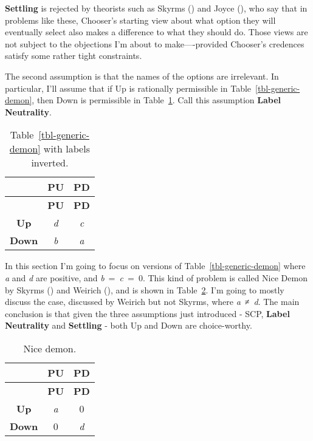 \documentclass[
  11pt,
  letterpaper,
  DIV=11,
  numbers=noendperiod,
  twoside]{scrartcl}
\begin{document}
\textbf{Settling} is rejected by theorists such as Skyrms
() and Joyce
(), who say that in problems like these,
Chooser's starting view about what option they will eventually select
also makes a difference to what they should do. Those views are not
subject to the objections I'm about to make----provided Chooser's
credences satisfy some rather tight constraints.

The second assumption is that the names of the options are irrelevant.
In particular, I'll assume that if Up is rationally permissible in
Table~\ref{tbl-generic-demon}, then Down is permissible in
Table~\ref{tbl-inverted-generic}. Call this assumption \textbf{Label
Neutrality}.

\begin{longtable}[]{@{}ccc@{}}
\caption{Table~\ref{tbl-generic-demon} with labels
inverted.}\label{tbl-inverted-generic}\tabularnewline
\toprule\noalign{}
& \textbf{PU} & \textbf{PD} \\
\midrule\noalign{}
\endfirsthead
\toprule\noalign{}
& \textbf{PU} & \textbf{PD} \\
\midrule\noalign{}
\endhead
\bottomrule\noalign{}
\endlastfoot
\textbf{Up} & \emph{d} & \emph{c} \\
\textbf{Down} & \emph{b} & \emph{a} \\
\end{longtable}

In this section I'm going to focus on versions of
Table~\ref{tbl-generic-demon} where \emph{a} and \emph{d} are positive,
and \emph{b}~=~\emph{c}~=~0. This kind of problem is called Nice Demon
by Skyrms () and Weirich
(), and is shown in
Table~\ref{tbl-nice-demon}. I'm going to mostly discuss the case,
discussed by Weirich but not Skyrms, where \emph{a}~≠~\emph{d}. The main
conclusion is that given the three assumptions just introduced - SCP,
\textbf{Label Neutrality} and \textbf{Settling} - both Up and Down are
choice-worthy.

\begin{longtable}[]{@{}ccc@{}}
\caption{Nice demon.}\label{tbl-nice-demon}\tabularnewline
\toprule\noalign{}
& \textbf{PU} & \textbf{PD} \\
\midrule\noalign{}
\endfirsthead
\toprule\noalign{}
& \textbf{PU} & \textbf{PD} \\
\midrule\noalign{}
\endhead
\bottomrule\noalign{}
\endlastfoot
\textbf{Up} & \emph{a} & 0 \\
\textbf{Down} & 0 & \emph{d} \\
\end{longtable}
\end{document}
